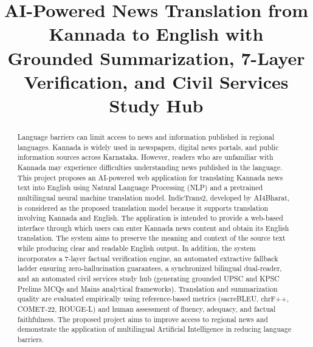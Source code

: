 \documentclass[conference]{IEEEtran}
\begin{document}
\title{AI-Powered News Translation from Kannada to English with Grounded Summarization, 7-Layer Verification, and Civil Services Study Hub}

\author{
\and
{}
\and
{}
}

\maketitle

\begin{abstract}
Language barriers can limit access to news and information published in regional languages. Kannada is widely used in newspapers, digital news portals, and public information sources across Karnataka. However, readers who are unfamiliar with Kannada may experience difficulties understanding news published in the language. This project proposes an AI-powered web application for translating Kannada news text into English using Natural Language Processing (NLP) and a pretrained multilingual neural machine translation model. IndicTrans2, developed by AI4Bharat, is considered as the proposed translation model because it supports translation involving Kannada and English. The application is intended to provide a web-based interface through which users can enter Kannada news content and obtain its English translation. The system aims to preserve the meaning and context of the source text while producing clear and readable English output. In addition, the system incorporates a 7-layer factual verification engine, an automated extractive fallback ladder ensuring zero-hallucination guarantees, a synchronized bilingual dual-reader, and an automated civil services study hub (generating grounded UPSC and KPSC Prelims MCQs and Mains analytical frameworks). Translation and summarization quality are evaluated empirically using reference-based metrics (sacreBLEU, chrF++, COMET-22, ROUGE-L) and human assessment of fluency, adequacy, and factual faithfulness. The proposed project aims to improve access to regional news and demonstrate the application of multilingual Artificial Intelligence in reducing language barriers.
\end{abstract}
\end{document}
